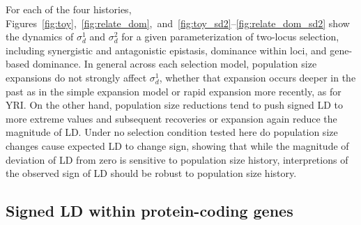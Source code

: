 \documentclass[]{article}
\begin{document}
For each of the four histories,
Figures~\ref{fig:toy},~\ref{fig:relate_dom},~and~\ref{fig:toy_sd2}--\ref{fig:relate_dom_sd2}
show the dynamics of \(\sigma_d^1\) and \(\sigma_d^2\) for a given
parameterization of two-locus selection, including synergistic and antagonistic
epistasis, dominance within loci, and gene-based dominance. In general across
each selection model, population size expansions do not strongly affect
\(\sigma_d^1\), whether that expansion occurs deeper in the past as in the
simple expansion model or rapid expansion more recently, as for YRI. On the
other hand, population size reductions tend to push signed LD to more extreme
values and subsequent recoveries or expansion again reduce the magnitude of LD.
Under no selection condition tested here do population size changes cause
expected LD to change sign, showing that while the magnitude of deviation of LD
from zero is sensitive to population size history, interpretions of the
observed sign of LD should be robust to population size history.

\subsection{Signed LD within protein-coding genes}
\end{document}
